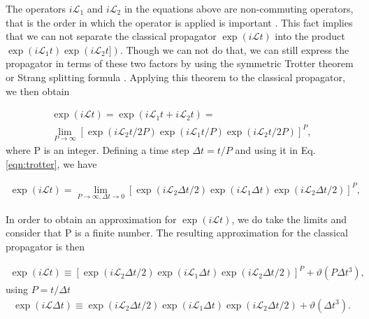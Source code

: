 The operators $i\mathcal{L}_{1}$ and $i\mathcal{L}_{2}$ in the equations above are non-commuting operators, that is the order in which the operator is applied is important \cite{tuckerman}. This fact implies that we can not separate the classical propagator $\exp (i\mathcal{L}t)$  into the product $\exp (i\mathcal{L}_{1}t) \exp (i\mathcal{L}_{2}t])$. Though we can not do that, we can still express the propagator in terms of these two factors by using the symmetric Trotter theorem or Strang splitting formula \cite{trotter,strang}. Applying this theorem to the classical propagator, we then obtain

\begin{equation}
\begin{aligned}
\exp (i\mathcal{L}t)  = \exp (i\mathcal{L}_{1}t + i\mathcal{L}_{2}t) = \\
\lim\limits_{P \rightarrow \infty} \left [ \exp (i\mathcal{L}_{2}t/2P) \exp (i\mathcal{L}_{1}t/P) \exp (i\mathcal{L}_{2}t/2P) \right ]^{P},
\end{aligned}
\label{eqn:trotter}
\end{equation}
where P is an integer. Defining a time step $\Delta t =t/P$ and using it in Eq. \ref{eqn:trotter}, we have

\begin{equation}
\begin{aligned}
\exp (i\mathcal{L}t)  = 
\lim\limits_{P \rightarrow \infty, \Delta t \rightarrow 0} \left [ \exp (i\mathcal{L}_{2} \Delta t/2) \exp (i\mathcal{L}_{1} \Delta t) \exp (i\mathcal{L}_{2} \Delta t/2) \right ]^{P},
\end{aligned}
\label{eqn:trotterdt}
\end{equation}

In order to obtain an approximation for $\exp (i\mathcal{L}t)$, we do take the limits and consider that P is a finite number. The resulting approximation for the classical propagator is then 

\begin{equation}
\begin{aligned}
\exp (i\mathcal{L}t)  \equiv
\left [ \exp (i\mathcal{L}_{2} \Delta t/2) \exp (i\mathcal{L}_{1} \Delta t) \exp (i\mathcal{L}_{2} \Delta t/2) \right ]^{P} + \vartheta (P \Delta t^{3}),
\end{aligned}
\end{equation}
using $P= t/\Delta t$
\begin{equation}
\begin{aligned}
\exp (i\mathcal{L} \Delta t)  \equiv
\exp (i\mathcal{L}_{2} \Delta t/2) \exp (i\mathcal{L}_{1} \Delta t) \exp (i\mathcal{L}_{2} \Delta t/2)  + \vartheta (\Delta t^{3}).
\end{aligned}
\label{eqn:trotterfin}
\end{equation}  

